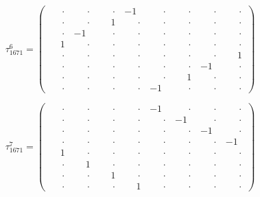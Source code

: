 \documentclass[
  10pt,
]{article}
\begin{document}
\[
\tau_{1671}^{6} = \left(\begin{array}{rrrr|rrrr}
\phantom{-}\cdot & \phantom{-}\cdot & \phantom{-}\cdot & -1 & \phantom{-}\cdot & \phantom{-}\cdot & \phantom{-}\cdot & \phantom{-}\cdot \\[-1.8pt]
\phantom{-}\cdot & \phantom{-}\cdot & \phantom{-}1 & \phantom{-}\cdot & \phantom{-}\cdot & \phantom{-}\cdot & \phantom{-}\cdot & \phantom{-}\cdot \\[-1.8pt]
\phantom{-}\cdot & -1 & \phantom{-}\cdot & \phantom{-}\cdot & \phantom{-}\cdot & \phantom{-}\cdot & \phantom{-}\cdot & \phantom{-}\cdot \\[-1.8pt]
\phantom{-}1 & \phantom{-}\cdot & \phantom{-}\cdot & \phantom{-}\cdot & \phantom{-}\cdot & \phantom{-}\cdot & \phantom{-}\cdot & \phantom{-}\cdot \\[-1.8pt]
\hline
\phantom{-}\cdot & \phantom{-}\cdot & \phantom{-}\cdot & \phantom{-}\cdot & \phantom{-}\cdot & \phantom{-}\cdot & \phantom{-}\cdot & \phantom{-}1 \\[-1.8pt]
\phantom{-}\cdot & \phantom{-}\cdot & \phantom{-}\cdot & \phantom{-}\cdot & \phantom{-}\cdot & \phantom{-}\cdot & -1 & \phantom{-}\cdot \\[-1.8pt]
\phantom{-}\cdot & \phantom{-}\cdot & \phantom{-}\cdot & \phantom{-}\cdot & \phantom{-}\cdot & \phantom{-}1 & \phantom{-}\cdot & \phantom{-}\cdot \\[-1.8pt]
\phantom{-}\cdot & \phantom{-}\cdot & \phantom{-}\cdot & \phantom{-}\cdot & -1 & \phantom{-}\cdot & \phantom{-}\cdot & \phantom{-}\cdot
\end{array}\right)
\]

\[
\tau_{1671}^{7} = \left(\begin{array}{rrrr|rrrr}
\phantom{-}\cdot & \phantom{-}\cdot & \phantom{-}\cdot & \phantom{-}\cdot & -1 & \phantom{-}\cdot & \phantom{-}\cdot & \phantom{-}\cdot \\[-1.8pt]
\phantom{-}\cdot & \phantom{-}\cdot & \phantom{-}\cdot & \phantom{-}\cdot & \phantom{-}\cdot & -1 & \phantom{-}\cdot & \phantom{-}\cdot \\[-1.8pt]
\phantom{-}\cdot & \phantom{-}\cdot & \phantom{-}\cdot & \phantom{-}\cdot & \phantom{-}\cdot & \phantom{-}\cdot & -1 & \phantom{-}\cdot \\[-1.8pt]
\phantom{-}\cdot & \phantom{-}\cdot & \phantom{-}\cdot & \phantom{-}\cdot & \phantom{-}\cdot & \phantom{-}\cdot & \phantom{-}\cdot & -1 \\[-1.8pt]
\hline
\phantom{-}1 & \phantom{-}\cdot & \phantom{-}\cdot & \phantom{-}\cdot & \phantom{-}\cdot & \phantom{-}\cdot & \phantom{-}\cdot & \phantom{-}\cdot \\[-1.8pt]
\phantom{-}\cdot & \phantom{-}1 & \phantom{-}\cdot & \phantom{-}\cdot & \phantom{-}\cdot & \phantom{-}\cdot & \phantom{-}\cdot & \phantom{-}\cdot \\[-1.8pt]
\phantom{-}\cdot & \phantom{-}\cdot & \phantom{-}1 & \phantom{-}\cdot & \phantom{-}\cdot & \phantom{-}\cdot & \phantom{-}\cdot & \phantom{-}\cdot \\[-1.8pt]
\phantom{-}\cdot & \phantom{-}\cdot & \phantom{-}\cdot & \phantom{-}1 & \phantom{-}\cdot & \phantom{-}\cdot & \phantom{-}\cdot & \phantom{-}\cdot
\end{array}\right)
\]
\end{document}
